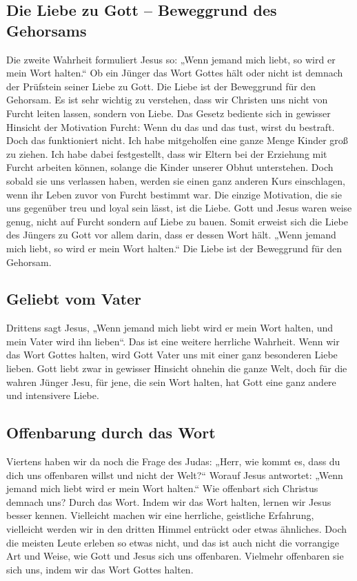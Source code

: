\subsection{Die Liebe zu Gott – Beweggrund des Gehorsams}

Die zweite Wahrheit formuliert Jesus so: „Wenn jemand mich liebt, so wird er mein Wort halten.“ 
Ob ein Jünger das Wort Gottes hält oder nicht ist demnach der Prüfstein seiner Liebe zu Gott. Die Liebe ist der Beweggrund für den Gehorsam. 
Es ist sehr wichtig zu verstehen, dass wir Christen uns nicht von Furcht leiten lassen, sondern von Liebe. Das Gesetz bediente sich in gewisser Hinsicht der Motivation Furcht: Wenn du das und das tust, wirst du bestraft. 
Doch das funktioniert nicht. 
Ich habe mitgeholfen eine ganze Menge Kinder groß zu ziehen. 
Ich habe dabei festgestellt, dass wir Eltern bei der Erziehung mit Furcht arbeiten können, solange die Kinder unserer Obhut unterstehen. 
Doch sobald sie uns verlassen haben, werden sie einen ganz anderen Kurs einschlagen, wenn ihr Leben zuvor von Furcht bestimmt war. 
Die einzige Motivation, die sie uns gegenüber treu und loyal sein lässt, ist die Liebe. 
Gott und Jesus waren weise genug, nicht auf Furcht sondern auf Liebe zu bauen. 
Somit erweist sich die Liebe des Jüngers zu Gott vor allem darin, dass er dessen Wort hält. 
„Wenn jemand mich liebt, so wird er mein Wort halten.“ Die Liebe ist der Beweggrund für den Gehorsam.

\subsection{Geliebt vom Vater}

Drittens sagt Jesus, „Wenn jemand mich liebt wird er mein Wort halten, und mein Vater wird ihn lieben“.
Das ist eine weitere herrliche Wahrheit. Wenn wir das Wort Gottes halten, wird Gott Vater uns mit einer ganz besonderen Liebe lieben.
Gott liebt zwar in gewisser Hinsicht ohnehin die ganze Welt, doch für die wahren Jünger Jesu, für jene, die sein Wort halten, hat Gott eine ganz andere und intensivere Liebe.

\subsection{Offenbarung durch das Wort}

Viertens haben wir da noch die Frage des Judas: „Herr, wie kommt es, dass du dich uns offenbaren willst und nicht der Welt?“
Worauf Jesus antwortet: „Wenn jemand mich liebt wird er mein Wort halten.“ Wie offenbart sich Christus demnach uns?
Durch das Wort. 
Indem wir das Wort halten, lernen wir Jesus besser kennen. 
Vielleicht machen wir eine herrliche, geistliche Erfahrung, vielleicht werden wir in den dritten Himmel entrückt oder etwas ähnliches. 
Doch die meisten Leute erleben so etwas nicht, und das ist auch nicht die vorrangige Art und Weise, wie Gott und Jesus sich uns offenbaren. 
Vielmehr offenbaren sie sich uns, indem wir das Wort Gottes halten.

